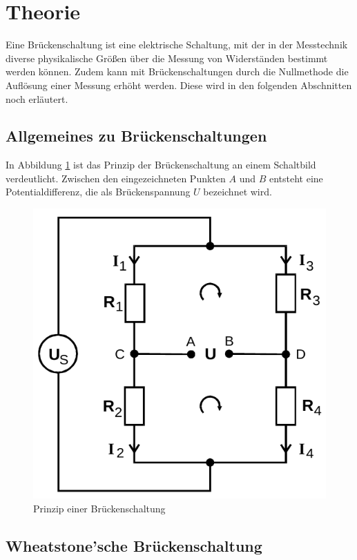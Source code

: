 \section{Theorie}
\label{sec:Theorie}
Eine Brückenschaltung ist eine elektrische Schaltung, mit der in der Messtechnik diverse physikalische Größen über die Messung von 
Widerständen bestimmt werden können. Zudem kann mit Brückenschaltungen durch die Nullmethode die Auflösung einer Messung erhöht werden.
Diese wird in den folgenden Abschnitten noch erläutert.

\subsection{Allgemeines zu Brückenschaltungen}                      
\label{sec:allg}
In Abbildung \ref{fig:allg} ist das Prinzip der Brückenschaltung an einem Schaltbild verdeutlicht. Zwischen den eingezeichneten Punkten
$A$ und $B$ entsteht eine Potentialdifferenz, die als Brückenspannung $U$ bezeichnet wird. 
\begin{figure}[H]
    \centering
    \includegraphics[scale=0.4]{pictures/1-allg.png}
    \caption{Prinzip einer Brückenschaltung}
    \label{fig:allg}
\end{figure}

\subsection{Wheatstone'sche Brückenschaltung}
\label{sec:wheatstone}

